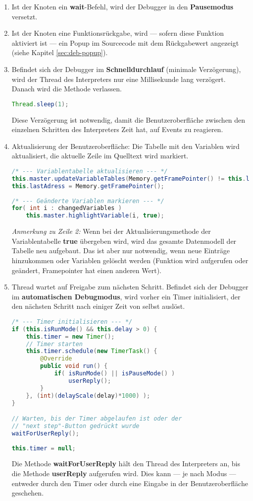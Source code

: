 \begin{enumerate}
\item Ist der Knoten ein \textbf{wait}-Befehl, wird der Debugger in den \textbf{Pausemodus} versetzt.
\item Ist der Knoten eine Funktionsrückgabe, wird --- sofern diese Funktion aktiviert ist --- ein Popup im Sourcecode mit dem Rückgabewert angezeigt (siehe Kapitel \ref{sec:deb-popup}).
\item Befindet sich der Debugger im \textbf{Schnelldurchlauf} (minimale Verzögerung), wird der Thread des Interpreters nur eine Millisekunde lang verzögert. Danach wird die Methode verlassen.
\begin{lstlisting}[language=JAVA]
Thread.sleep(1);
\end{lstlisting}
Diese Verzögerung ist notwendig, damit die Benutzeroberfläche zwischen den einzelnen Schritten des Interpreters Zeit hat, auf Events zu reagieren.

\item Aktualisierung der Benutzeroberfläche: Die Tabelle mit den Variablen wird aktualisiert, die aktuelle Zeile im Quelltext wird markiert.
\begin{lstlisting}[language=JAVA]
/* --- Variablentabelle aktualisieren --- */
this.master.updateVariableTables(Memory.getFramePointer() != this.lastAdress);
this.lastAdress = Memory.getFramePointer();
		
/* --- Geänderte Variablen markieren --- */
for( int i : changedVariables )
	this.master.highlightVariable(i, true);
\end{lstlisting}
\emph{Anmerkung zu Zeile 2:} Wenn bei der Aktualisierungsmethode der Variablentabelle \textbf{true} übergeben wird, wird das gesamte Datenmodell der Tabelle neu aufgebaut. Das ist aber nur notwendig, wenn neue Einträge hinzukommen oder Variablen gelöscht werden (Funktion wird aufgerufen oder geändert, Framepointer hat einen anderen Wert).

\item Thread wartet auf Freigabe zum nächsten Schritt. Befindet sich der Debugger im \textbf{automatischen Debugmodus}, wird vorher ein Timer initialisiert, der den nächsten Schritt nach einiger Zeit von selbst auslöst.
\begin{lstlisting}[language=JAVA]
/* --- Timer initialisieren --- */
if (this.isRunMode() && this.delay > 0) {
	this.timer = new Timer();
	// Timer starten
	this.timer.schedule(new TimerTask() {
		@Override
		public void run() {
			if( isRunMode() || isPauseMode() )
				userReply();
		}
	}, (int)(delayScale(delay)*1000) );
}

// Warten, bis der Timer abgelaufen ist oder der
// "next step"-Button gedrückt wurde
waitForUserReply();
		
this.timer = null;
\end{lstlisting}
Die Methode \textbf{waitForUserReply} hält den Thread des Interpreters an, bis die Methode \textbf{userReply} aufgerufen wird. Dies kann --- je nach Modus --- entweder durch den Timer oder durch eine Eingabe in der Benutzeroberfläche geschehen.
\end{enumerate}

